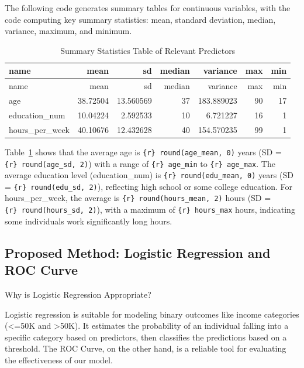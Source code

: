 \documentclass[
  letterpaper,
  DIV=11,
  numbers=noendperiod]{scrartcl}
\begin{document}
The following code generates summary tables for continuous variables,
with the code computing key summary statistics: mean, standard
deviation, median, variance, maximum, and minimum.

\hypertarget{tbl-summary-statistics}{}
\begin{longtable}[]{@{}lrrrrrr@{}}
\caption{\label{tbl-summary-statistics}Summary Statistics Table of
Relevant Predictors}\tabularnewline
\toprule\noalign{}
name & mean & sd & median & variance & max & min \\
\midrule\noalign{}
\endfirsthead
\toprule\noalign{}
name & mean & sd & median & variance & max & min \\
\midrule\noalign{}
\endhead
\bottomrule\noalign{}
\endlastfoot
age & 38.72504 & 13.560569 & 37 & 183.889023 & 90 & 17 \\
education\_num & 10.04224 & 2.592533 & 10 & 6.721227 & 16 & 1 \\
hours\_per\_week & 40.10676 & 12.432628 & 40 & 154.570235 & 99 & 1 \\
\end{longtable}

Table~\ref{tbl-summary-statistics} shows that the average age is
\texttt{\{r\}\ round(age\_mean,\ 0)} years (SD =
\texttt{\{r\}\ round(age\_sd,\ 2)}) with a range of
\texttt{\{r\}\ age\_min} to \texttt{\{r\}\ age\_max}. The average
education level (education\_num) is \texttt{\{r\}\ round(edu\_mean,\ 0)}
years (SD = \texttt{\{r\}\ round(edu\_sd,\ 2)}), reflecting high school
or some college education. For hours\_per\_week, the average is
\texttt{\{r\}\ round(hours\_mean,\ 2)} hours (SD =
\texttt{\{r\}\ round(hours\_sd,\ 2)}), with a maximum of
\texttt{\{r\}\ hours\_max} hours, indicating some individuals work
significantly long hours.

\hypertarget{proposed-method-logistic-regression-and-roc-curve}{%
\subsection{Proposed Method: Logistic Regression and ROC
Curve}\label{proposed-method-logistic-regression-and-roc-curve}}

Why is Logistic Regression Appropriate?

Logistic regression is suitable for modeling binary outcomes like income
categories (\textless=50K and \textgreater50K). It estimates the
probability of an individual falling into a specific category based on
predictors, then classifies the predictions based on a threshold. The
ROC Curve, on the other hand, is a reliable tool for evaluating the
effectiveness of our model.
\end{document}
